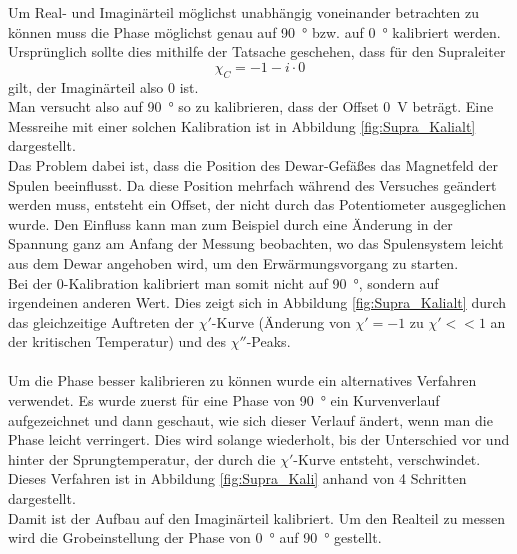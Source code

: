 \documentclass[12pt,a4paper]{article}
\begin{document}
Um Real- und Imaginärteil möglichst unabhängig voneinander betrachten zu können muss die Phase möglichst genau auf \SI{90}{\degree} bzw. auf \SI{0}{\degree} kalibriert werden. Ursprünglich sollte dies mithilfe der Tatsache geschehen, dass für den Supraleiter
\begin{equation*}
\chi_C = -1-i\cdot 0
\end{equation*}
gilt, der Imaginärteil also 0 ist.\\
Man versucht also auf \SI{90}{\degree} so zu kalibrieren, dass der Offset \SI{0}{V} beträgt. Eine Messreihe mit einer solchen Kalibration ist in Abbildung \ref{fig:Supra_Kalialt} dargestellt.\\
Das Problem dabei ist, dass die Position des Dewar-Gefäßes das Magnetfeld der Spulen beeinflusst. Da diese Position mehrfach während des Versuches geändert werden muss, entsteht ein Offset, der nicht durch das Potentiometer ausgeglichen wurde. Den Einfluss kann man zum Beispiel durch eine Änderung in der Spannung ganz am Anfang der Messung beobachten, wo das Spulensystem leicht aus dem Dewar angehoben wird, um den Erwärmungsvorgang zu starten.\\
Bei der 0-Kalibration kalibriert man somit nicht auf \SI{90}{\degree}, sondern auf irgendeinen anderen Wert. Dies zeigt sich in Abbildung \ref{fig:Supra_Kalialt} durch das gleichzeitige Auftreten der $\chi'$-Kurve (Änderung von $\chi' = -1$ zu $\chi' << 1$ an der kritischen Temperatur) und des $\chi''$-Peaks.\\
\\
Um die Phase besser kalibrieren zu können wurde ein alternatives Verfahren verwendet. Es wurde zuerst für eine Phase von \SI{90}{\degree} ein Kurvenverlauf aufgezeichnet und dann geschaut, wie sich dieser Verlauf ändert, wenn man die Phase leicht verringert. Dies wird solange wiederholt, bis der Unterschied vor und hinter der Sprungtemperatur, der durch die $\chi'$-Kurve entsteht, verschwindet. Dieses Verfahren ist in Abbildung \ref{fig:Supra_Kali} anhand von 4 Schritten dargestellt.\\
Damit ist der Aufbau auf den Imaginärteil kalibriert. Um den Realteil zu messen wird die Grobeinstellung der Phase von \SI{0}{\degree} auf \SI{90}{\degree} gestellt.
\end{document}
